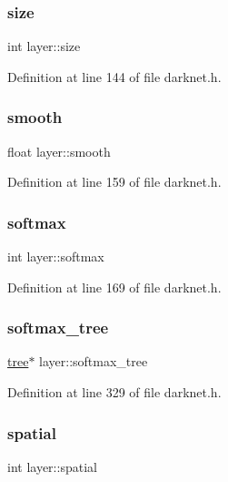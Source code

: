 \subsubsection{\texorpdfstring{size}{size}}
{\footnotesize\ttfamily int layer\+::size}



Definition at line 144 of file darknet.\+h.

\mbox{\label{structlayer_a4ecd91c02a2368b51bdfa66d3b92c6d6}} 
\subsubsection{\texorpdfstring{smooth}{smooth}}
{\footnotesize\ttfamily float layer\+::smooth}



Definition at line 159 of file darknet.\+h.

\mbox{\label{structlayer_a7b07ddac3afad25586ff7c18956ba9a9}} 
\subsubsection{\texorpdfstring{softmax}{softmax}}
{\footnotesize\ttfamily int layer\+::softmax}



Definition at line 169 of file darknet.\+h.

\mbox{\label{structlayer_ada8540db939d29074a5764ac9ba92f57}} 
\subsubsection{\texorpdfstring{softmax\_tree}{softmax\_tree}}
{\footnotesize\ttfamily \mbox{\hyperlink{structtree}{tree}}$\ast$ layer\+::softmax\+\_\+tree}



Definition at line 329 of file darknet.\+h.

\mbox{\label{structlayer_aeca00102f8c93bcb3e30670623e835de}} 
\subsubsection{\texorpdfstring{spatial}{spatial}}
{\footnotesize\ttfamily int layer\+::spatial}



